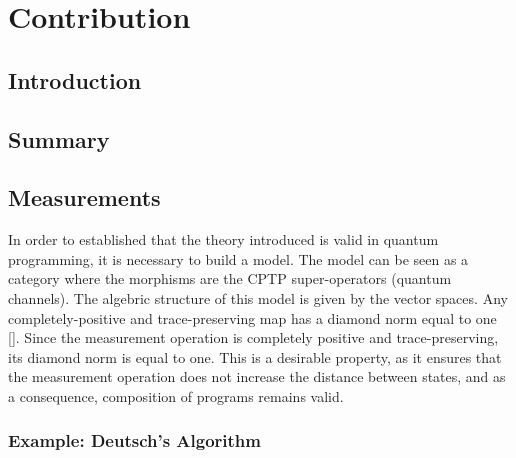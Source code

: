 \chapter{Contribution}





\section{Introduction}

\section{Summary}



\section{Measurements}

In order to established that the theory introduced is valid in quantum programming, it is necessary to build a model. The model can be seen as a category where the morphisms are the CPTP super-operators (quantum channels). The algebric structure of this model is given by the vector spaces. 
Any completely-positive and trace-preserving map has a diamond norm equal to one [\cite{watrous2018theory}]. Since the measurement operation is completely positive and trace-preserving, its  diamond norm is equal to one. This is a desirable property, as it ensures that the measurement operation does not increase the distance between states, and as a consequence, composition of programs remains valid.


\subsection{Example: Deutsch's Algorithm}

